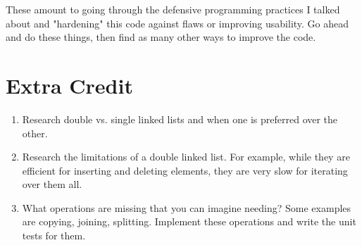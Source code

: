 These amount to going through the defensive programming practices I talked about
and "hardening" this code against flaws or improving usability.  Go ahead and
do these things, then find as many other ways to improve the code.

\section{Extra Credit}

\begin{enumerate}
\item Research double vs. single linked lists and when one is preferred over
    the other.
\item Research the limitations of a double linked list.  For example, while they
    are efficient for inserting and deleting elements, they are very slow for
    iterating over them all.
\item What operations are missing that you can imagine needing?  Some examples
    are copying, joining, splitting.  Implement these operations and write the
    unit tests for them.
\end{enumerate}

